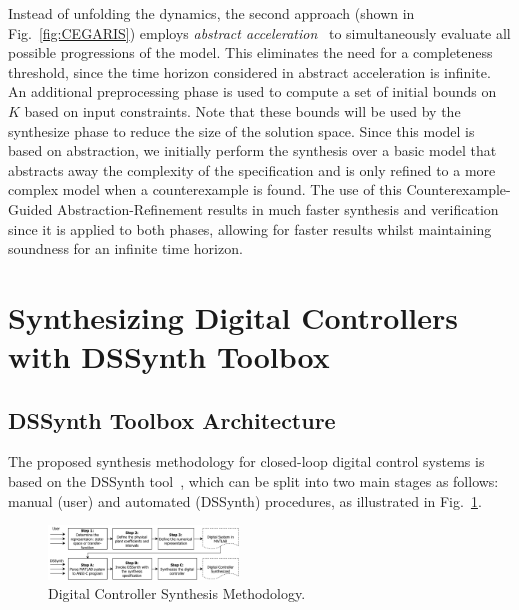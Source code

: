 \documentclass[10pt,conference]{IEEEtran}
\newcommand\tool{{DSSynth Toolbox}\xspace}
\begin{document}
Instead of unfolding the dynamics, the second approach (shown in Fig.~\ref{fig:CEGARIS}) 
employs {\em abstract acceleration}~\cite{cattaruzza2015unbounded} to 
simultaneously evaluate all possible progressions of the model. This eliminates the need for
a completeness threshold, since the time horizon considered in abstract acceleration is infinite.
An additional preprocessing phase is used to compute 
a set of initial bounds on $K$ based on input constraints. 
Note that these bounds will be used by the {\sc synthesize} phase to reduce the size of the solution space.
%
Since this model is based on abstraction, we initially perform the synthesis over a basic
model that abstracts away the complexity of the specification and is only refined to a more
complex model when a counterexample is found. 
The use of this Counterexample-Guided 
Abstraction-Refinement results in much faster synthesis and verification since it is applied to
both phases, allowing for faster results whilst maintaining soundness for an infinite time horizon.
 

\section{Synthesizing Digital Controllers with \tool}

\subsection{\tool Architecture}

The proposed synthesis methodology for closed-loop digital control
systems is based on the DSSynth tool~\cite{abate2017, abatecav2017}, 
which can be split into two main stages as follows: manual (user) and 
automated (DSSynth) procedures, as illustrated in Fig.~\ref{fig:synthesis-flow}. 
%
\begin{figure}[ht!]
\centering
\includegraphics[width=0.45\textwidth]{synthesis-flow.pdf}
\caption{Digital Controller Synthesis Methodology.}
\label{fig:synthesis-flow}
\end{figure}
\end{document}
